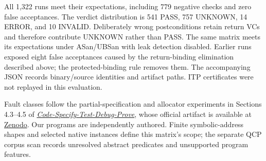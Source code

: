 \documentclass[10pt]{article}
\begin{document}
All 1,322 runs meet their expectations, including 779 negative checks and
zero false acceptances. The verdict distribution is 541 PASS, 757 UNKNOWN,
14 ERROR, and 10 INVALID. Deliberately wrong postconditions retain return
VCs and therefore contribute UNKNOWN rather than PASS. The same matrix
meets its expectations under ASan/UBSan with leak detection disabled.
Earlier runs exposed eight false acceptances caused by the return-binding
elimination described above; the protected-binding rule removes them.
The accompanying JSON records binary/source identities and artifact paths.
ITP certificates were not replayed in this evaluation.

Fault classes follow the partial-specification and allocator experiments
in Sections 4.3--4.5 of
\href{https://doi.org/10.1145/3808278}{\emph{Code-Specify-Test-Debug-Prove}},
whose official artifact is available at
\href{https://zenodo.org/records/19577402}{Zenodo}.
Our programs are independently authored. Finite symbolic-address shapes
and selected native instances define this matrix's scope; the separate
QCP corpus scan records unresolved abstract predicates and unsupported
program features.
\end{document}
